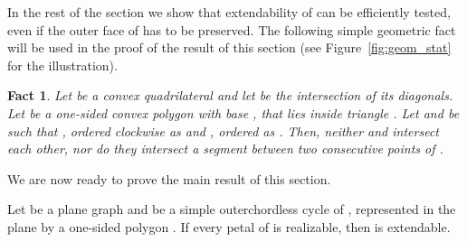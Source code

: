 \documentclass{llncs}
\newtheorem{fact}{Fact}
\begin{document}
In the rest of the section we show that extendability of  can be efficiently tested, even if the outer face of  has to be preserved. The following simple geometric fact will be used in the proof of the result of this section (see Figure~\ref{fig:geom_stat} for the illustration). 
\begin{fact}
\label{stat:no_crossings}
Let  be a convex quadrilateral and let  be the intersection of its diagonals. Let  be a one-sided convex polygon with base , that lies inside triangle . Let  and  be such that , ordered clockwise as  and , ordered as . Then, neither   and   intersect each other, nor do they intersect a segment between two consecutive points of . 
\end{fact}

We are now ready to prove the main result of this section.
\begin{theorem}
\label{theor:one-sided} Let  be a plane graph and  be a simple outerchordless cycle of , represented in the plane by a one-sided polygon .
If every petal of  is realizable, then  is extendable.
\end{theorem}
\end{document}
